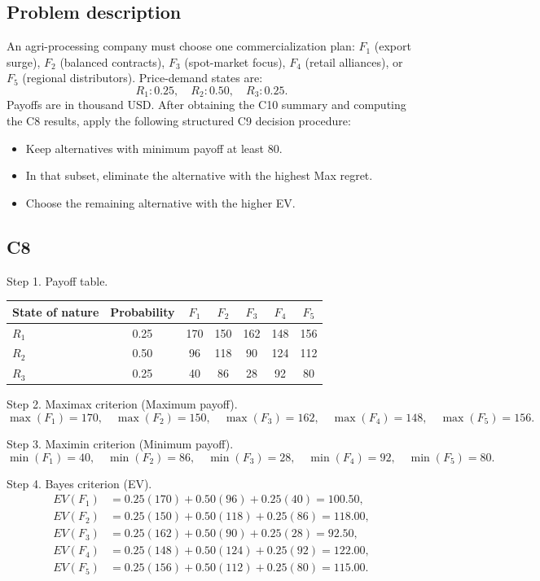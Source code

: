 \begin{ExamProblems}
		\subsection*{Problem description}
		An agri-processing company must choose one commercialization plan:
		$F_1$ (export surge), $F_2$ (balanced contracts), $F_3$ (spot-market focus), $F_4$ (retail alliances), or $F_5$ (regional distributors).
		Price-demand states are:
		\[
		R_1:0.25,\quad R_2:0.50,\quad R_3:0.25.
		\]
		Payoffs are in thousand USD.
		After obtaining the C10 summary and computing the C8 results, apply the following structured C9 decision procedure:
		\begin{itemize}
			\item Keep alternatives with minimum payoff at least 80.
			\item In that subset, eliminate the alternative with the highest Max regret.
			\item Choose the remaining alternative with the higher EV.
		\end{itemize}

		\subsection*{C8}
		Step 1. Payoff table.
		\begin{center}
			\begin{tabular}{l c c c c c c}
				\toprule
				State of nature & Probability & $F_1$ & $F_2$ & $F_3$ & $F_4$ & $F_5$ \\
				\midrule
				$R_1$ & 0.25 & 170 & 150 & 162 & 148 & 156 \\
				$R_2$ & 0.50 & 96 & 118 & 90 & 124 & 112 \\
				$R_3$ & 0.25 & 40 & 86 & 28 & 92 & 80 \\
				\bottomrule
			\end{tabular}
		\end{center}

		Step 2. Maximax criterion (Maximum payoff).
		\[
		\max(F_1)=170,\quad \max(F_2)=150,\quad \max(F_3)=162,\quad \max(F_4)=148,\quad \max(F_5)=156.
		\]

		Step 3. Maximin criterion (Minimum payoff).
		\[
		\min(F_1)=40,\quad \min(F_2)=86,\quad \min(F_3)=28,\quad \min(F_4)=92,\quad \min(F_5)=80.
		\]

		Step 4. Bayes criterion (EV).
		\[
		\begin{aligned}
		EV(F_1)&=0.25(170)+0.50(96)+0.25(40)=100.50,\\
		EV(F_2)&=0.25(150)+0.50(118)+0.25(86)=118.00,\\
		EV(F_3)&=0.25(162)+0.50(90)+0.25(28)=92.50,\\
		EV(F_4)&=0.25(148)+0.50(124)+0.25(92)=122.00,\\
		EV(F_5)&=0.25(156)+0.50(112)+0.25(80)=115.00.
		\end{aligned}
		\]


\end{ExamProblems}

